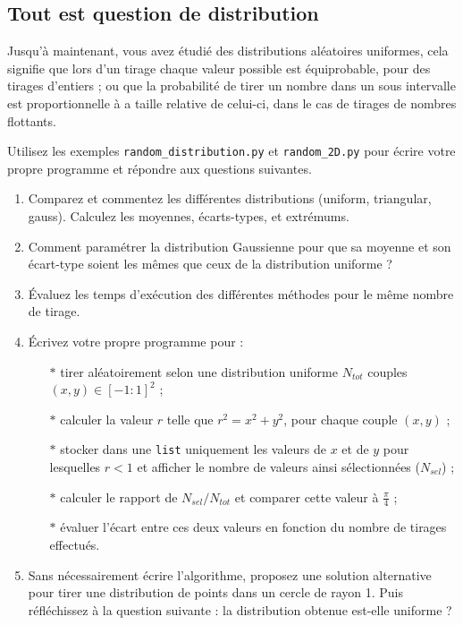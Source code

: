 

\subsection{Tout est question de distribution}

Jusqu'à  maintenant, vous  avez étudié   des distributions  aléatoires
uniformes, cela signifie que lors d'un tirage chaque valeur possible est
équiprobable, pour des tirages d'entiers ; ou que la probabilité de tirer 
un nombre dans un sous intervalle est proportionnelle à a taille relative 
de celui-ci, dans le cas de tirages de nombres flottants.

Utilisez les  exemples \texttt{random\_distribution.py} et
\texttt{random\_2D.py} pour écrire votre  propre programme et répondre
aux questions suivantes.


\begin{enumerate}
\item Comparez  et commentez  les différentes  distributions (uniform,
  triangular, gauss).  Calculez les  moyennes, écarts-types, et extrémums.
\item Comment paramétrer la distribution Gaussienne pour que sa moyenne
  et son écart-type soient les mêmes que ceux de la distribution uniforme ? 
\item Évaluez les  temps d'exécution des différentes  méthodes pour le
  même nombre de tirage.  %
\item Écrivez votre propre programme pour :
  \begin{itemize}
  \item[$\ast$] tirer  aléatoirement selon une distribution uniforme 
    $N_{tot}$ couples $(x,y) \in [-1:1]^2$ ;
  \item[$\ast$] calculer la valeur $r$ telle que
    $r^2 = x^2+y^2$, pour chaque couple $(x,y)$ ;
  \item[$\ast$] stocker dans une \texttt{list} 
    uniquement les valeurs de $x$  et de $y$
    pour lesquelles $r < 1$ et  afficher le nombre de valeurs ainsi
    sélectionnées ($N_{sel}$) ;
  \item[$\ast$] calculer  le rapport de $N_{sel}/N_{tot}$  et comparer
    cette valeur à $\frac{\pi}{4}$ ;
  \item[$\ast$] évaluer l'écart entre ces  deux valeurs en fonction du
    nombre de tirages effectués.
  \end{itemize}
\item Sans  nécessairement écrire l'algorithme, proposez  une solution
  alternative pour tirer une distribution  de points dans un cercle de
  rayon 1. Puis réfléchissez à la question suivante : 
  \og{} la distribution obtenue est-elle uniforme ? \fg{} 




  
\end{enumerate}


\vfill
